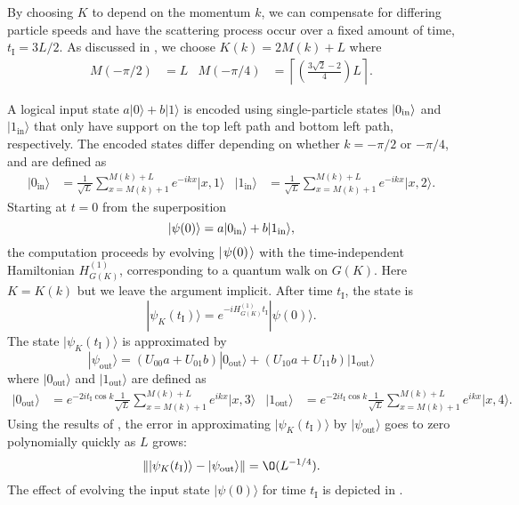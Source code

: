 \documentclass[../thesis-main/thesis-main]{subfiles}
\begin{document}
By choosing $K$ to depend on the momentum $k$, we can compensate for differing particle speeds and have the scattering process occur over a fixed amount of time, $t_{\mathrm{I}}={3L}/{2}$. As discussed in , we choose $K(k)=2M(k)+L$ where 
\begin{align*}
M(-{\pi}/{2}) & =  L &
M(-{\pi}/{4}) & =  \left\lceil \left(\frac{3\sqrt{2} - 2}{4}\right)L\right\rceil .
\end{align*}
 
A logical input state $a|0\rangle+b|1\rangle$ is encoded using single-particle
states $|0_{\text{\text{in}}}\rangle$ and $|1_{\text{in}}\rangle$
that only have support on the top left path and bottom left
path, respectively. The encoded states differ depending on whether
$k=-{\pi}/{2}$ or $-{\pi}/{4}$, and are defined as
\begin{align*}
|0_{\text{in}}\rangle & =  \frac{1}{\sqrt{L}}\sum_{x=M(k)+1}^{M(k)+L}e^{-ikx}|x,1\rangle &
|1_{\text{in}}\rangle & =  \frac{1}{\sqrt{L}}\sum_{x=M(k)+1}^{M(k)+L}e^{-ikx}|x,2\rangle.
\end{align*}
Starting at $t=0$ from the superposition 
\[
|\psi(0)\rangle=a|0_{\text{\text{in}}}\rangle+b|1_{\text{\text{in}}}\rangle,
\]
the computation proceeds by evolving $|\mspace{2mu} \psi(0) \mspace{2mu} \rangle$ with the time-independent Hamiltonian $H_{G(K)}^{(1)}$, corresponding to a quantum walk on $G(K)$. Here $K=K(k)$ but we leave the argument implicit. After time $t_{\mathrm{I}}$, the state is
\[
|\psi_{K}(t_{\mathrm{I}})\rangle=e^{-iH_{G(K)}^{(1)} t_{\mathrm{I}}}|\psi(0)\rangle.
\]
The state $|\psi_{K}(t_{\mathrm{I}})\rangle$ is approximated
by 
\begin{equation}
|\psi_{\text{out}}\rangle=\left(U_{00}a+U_{01}b\right)|0_{\text{out}}\rangle+\left(U_{10}a+U_{11}b\right)|1_{\text{out}}\rangle
\label{eq:time_evolved}
\end{equation}
where $|0_{\text{out}}\rangle$ and $|1_{\text{out}}\rangle$ are defined as
\begin{align*}
|0_{\text{out}}\rangle & =  e^{-2it_{\mathrm{I}}\cos k}\frac{1}{\sqrt{L}}\sum_{x=M(k)+1}^{M(k)+L}e^{ikx}|x,3\rangle &
|1_{\text{out}}\rangle & =  e^{-2it_{\mathrm{I}}\cos k}\frac{1}{\sqrt{L}}\sum_{x=M(k)+1}^{M(k)+L}e^{ikx}|x,4\rangle.
\end{align*}
Using the results of , the error in approximating $|\psi_{K}(t_{\mathrm{I}})\rangle$
by $|\psi_{\text{out}}\rangle$ goes to zero polynomially quickly
as $L$ grows: 
\begin{equation}
\left\Vert |\psi_{K}(t_{\mathrm{I}})\rangle-|\psi_{\text{out}}\rangle\right\Vert =\O(L^{-{1}/{4}}).
\label{eq:error_single_qubit}
\end{equation}
The effect of evolving the input state $|\psi(0)\rangle$ for time $t_{\mathrm{I}}$ is depicted in .
\end{document}
